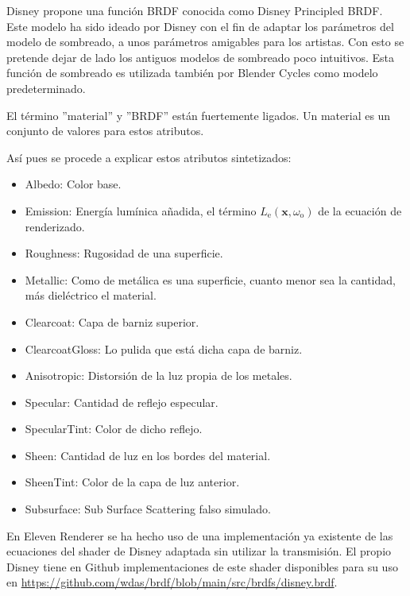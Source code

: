 Disney propone una función BRDF conocida como Disney Principled BRDF\cite{burley2012physically}. Este modelo ha sido ideado por Disney con el fin de adaptar los parámetros del modelo de sombreado, a unos parámetros amigables para los artistas. Con esto se pretende dejar de lado los antiguos modelos de sombreado poco intuitivos. Esta función de sombreado es utilizada también por Blender Cycles como modelo predeterminado.
	
El término ''material'' y ''BRDF'' están fuertemente ligados. Un material es un conjunto de valores para estos atributos.
		
Así pues se procede a explicar estos atributos sintetizados:

\begin{itemize}

	\item Albedo: Color base.
	\item Emission: Energía lumínica añadida, el término $L_{\text{e}}(\mathbf {x} ,\omega _{\text{o}})$ de la ecuación de renderizado.
	\item Roughness: Rugosidad de una superficie.
	\item Metallic: Como de metálica es una superficie, cuanto menor sea la cantidad, más dieléctrico el material.
	\item Clearcoat: Capa de barniz superior.
	\item ClearcoatGloss: Lo pulida que está dicha capa de barniz.
	\item Anisotropic: Distorsión de la luz propia de los metales.
	\item Specular: Cantidad de reflejo especular.
	\item SpecularTint: Color de dicho reflejo.
	\item Sheen: Cantidad de luz en los bordes del material.
	\item SheenTint: Color de la capa de luz anterior.
	\item Subsurface: Sub Surface Scattering falso simulado.
	
\end{itemize}

En Eleven Renderer se ha hecho uso de una implementación ya existente\cite{knightcrawler25} de las ecuaciones del shader de Disney adaptada sin utilizar la transmisión. El propio Disney tiene en Github implementaciones de este shader disponibles para su uso en \url{https://github.com/wdas/brdf/blob/main/src/brdfs/disney.brdf}.
	
